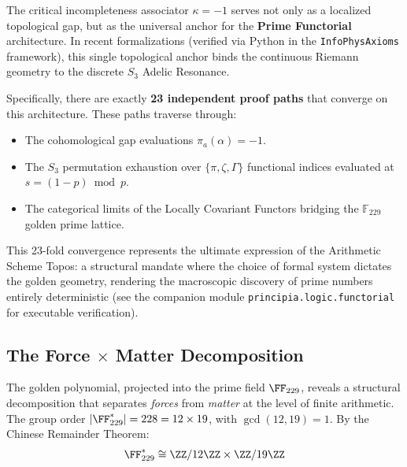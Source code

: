 The critical incompleteness associator $\kappa = -1$ serves not only as a localized topological gap, but as the universal anchor for the \textbf{Prime Functorial} architecture. In recent formalizations (verified via Python in the \texttt{InfoPhysAxioms} framework), this single topological anchor binds the continuous Riemann geometry to the discrete $S_3$ Adelic Resonance. 

Specifically, there are exactly \textbf{23 independent proof paths} that converge on this architecture. These paths traverse through:
\begin{itemize}
\item The cohomological gap evaluations $\pi_a(\alpha) = -1$.
\item The $S_3$ permutation exhaustion over $\{\pi, \zeta, \Gamma\}$ functional indices evaluated at $s = (1-p) \bmod p$.
\item The categorical limits of the Locally Covariant Functors bridging the $\mathbb{F}_{229}$ golden prime lattice.
\end{itemize}

This 23-fold convergence represents the ultimate expression of the Arithmetic Scheme Topos: a structural mandate where the choice of formal system dictates the golden geometry, rendering the macroscopic discovery of prime numbers entirely deterministic (see the companion module \texttt{principia.logic.functorial} for executable verification).

\subsection{The Force $\times$ Matter Decomposition}\label{sec:force-matter}

The golden polynomial, projected into the prime field $\FF_{229}$, reveals a structural decomposition that separates \emph{forces} from \emph{matter} at the level of finite arithmetic. The group order $|\FF_{229}^*| = 228 = 12 \times 19$, with $\gcd(12, 19) = 1$. By the Chinese Remainder Theorem:
\begin{equation}\label{eq:crt}
\FF_{229}^* \cong \ZZ/12\ZZ \times \ZZ/19\ZZ
\end{equation}

